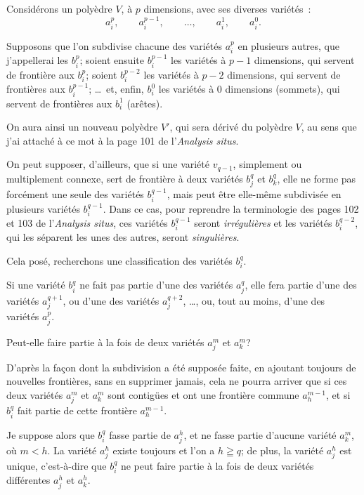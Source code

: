 \documentclass{article}
\begin{document}
Considérons un polyèdre $V$, à $p$ dimensions, avec ses diverses variétés~:
\[ a^{p}_{i}, \qquad a^{p-1}_{i}, \qquad \ldots, \qquad a^{1}_{i}, \qquad a^{0}_{i}. \]

Supposons que l'on subdivise chacune des variétés $a^{p}_{i}$ en plusieurs autres, que j'appellerai les $b^{p}_{i}$; soient ensuite $b^{p-1}_{i}$ les variétés à $p - 1$ dimensions, qui servent de frontière aux $b^{p}_{i}$; soient $b^{p-2}_{i}$ les variétés à $p - 2$ dimensions, qui servent de frontières aux $b^{p-1}_{i}$; \ldots\ et, enfin, $b^{0}_{i}$ les variétés à 0 dimensions (sommets), qui servent de frontières aux $b^{1}_{i}$ (arêtes).

On aura ainsi un nouveau polyèdre $V'$, qui sera dérivé du polyèdre $V$, au sens que j'ai attaché à ce mot à la page 101 de l'\emph{Analysis situs}.

On peut supposer, d'ailleurs, que si une variété $v_{q-1}$, simplement ou multiplement connexe, sert de frontière à deux variétés $b^{q}_{j}$ et $b^{q}_{k}$, elle ne forme pas forcément une seule des variétés $b^{q-1}_{i}$, mais peut être elle-même subdivisée en plusieurs variétés $b^{q-1}_{i}$. Dans ce cas, pour reprendre la terminologie des pages 102 et 103 de l'\emph{Analysis situs}, ces variétés $b^{q-1}_{i}$ seront \emph{irrégulières} et les variétés $b^{q-2}_{i}$, qui les séparent les unes des autres, seront \emph{singulières}.


Cela posé, recherchons une classification des variétés $b^{q}_{i}$.

Si une variété $b^{q}_{i}$ ne fait pas partie d'une des variétés $a^{q}_{j}$, elle fera partie d'une des variétés $a^{q+1}_{j}$, ou d'une des variétés $a^{q+2}_{j}$, \ldots, ou, tout au moins, d'une des variétés $a^{p}_{j}$.

Peut-elle faire partie à la fois de deux variétés $a^{m}_{j}$ et $a^{m}_{k}$?

D'après la façon dont la subdivision a été supposée faite, en ajoutant toujours de nouvelles frontières, sans en supprimer jamais, cela ne pourra arriver que si ces deux variétés $a^{m}_{j}$ et $a^{m}_{k}$ sont contigües et ont une frontière commune $a^{m-1}_{h}$, et si $b^{q}_{i}$ fait partie de cette frontière $a^{m-1}_{h}$.

Je suppose alors que $b^{q}_{i}$ fasse partie de $a^{h}_{j}$, et ne fasse partie d'aucune variété $a^{m}_{k}$, où $m < h$. La variété $a^{h}_{j}$ existe toujours et l'on a $h \geqq q$; de plus, la variété $a^{h}_{j}$ est unique, c'est-à-dire que $b^{q}_{i}$ ne peut faire partie à la fois de deux variétés différentes $a^{h}_{j}$ et $a^{h}_{k}$.
\end{document}
